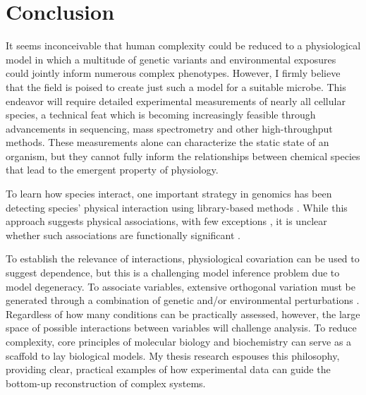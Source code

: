 \section{Conclusion}

It seems inconceivable that human complexity could be reduced to a physiological model in which a multitude of genetic variants and environmental exposures could jointly inform numerous complex phenotypes. However, I firmly believe that the field is poised to create just such a model for a suitable microbe. This endeavor will require detailed experimental measurements of nearly all cellular species, a technical feat which is becoming increasingly feasible through advancements in sequencing, mass spectrometry and other high-throughput methods. These measurements alone can characterize the static state of an organism, but they cannot fully inform the relationships between chemical species that lead to the emergent property of physiology. 

To learn how species interact, one important strategy in genomics has been detecting species' physical interaction using library-based methods \cite{LiebermanAiden:2009jz, Fields:1989dm, Orsak:2012ci, Johnson:2007fh}.  While this approach suggests physical associations, with few exceptions \cite{Reynolds:2011gs}, it is unclear whether such associations are functionally significant \cite{Nandy:2010ej, Scheer:2011df}. 

To establish the relevance of interactions, physiological covariation can be used to suggest dependence, but this is a challenging model inference problem due to model degeneracy. To associate variables, extensive orthogonal variation must be generated through a combination of genetic and/or environmental perturbations \cite{Greenberg:2011jf}. Regardless of how many conditions can be practically assessed, however, the large space of possible interactions between variables will challenge analysis. To reduce complexity, core principles of molecular biology and biochemistry can serve as a scaffold to lay biological models. My thesis research espouses this philosophy, providing clear, practical examples of how experimental data can guide the bottom-up reconstruction of complex systems.

